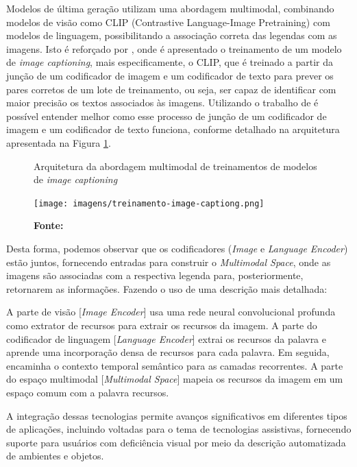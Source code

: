 Modelos de última geração utilizam uma abordagem multimodal, combinando modelos de visão como CLIP (Contrastive Language-Image Pretraining) com modelos de linguagem, possibilitando a associação correta das legendas com as imagens. Isto é reforçado por , onde é apresentado o treinamento de um modelo de \textit{image captioning}, mais especificamente, o CLIP, que é treinado a partir da junção de um codificador de imagem e um codificador de texto para prever os pares corretos de um lote de treinamento, ou seja, ser capaz de identificar com maior precisão os textos associados às imagens. Utilizando o trabalho de  é possível entender melhor como esse processo de junção de um codificador de imagem e um codificador de texto funciona, conforme detalhado na arquitetura apresentada na Figura \ref{fig:1}.

\begin{figure}[!ht]
     \caption{Arquitetura da abordagem multimodal de treinamentos de modelos de \textit{image captioning}}
     \centering
     \texttt{[image: imagens/treinamento-image-captiong.png]}
     \label{fig:1}
     \caption*{\textbf{Fonte:} }
\end{figure}

Desta forma, podemos observar que os codificadores (\textit{Image} e \textit{Language Encoder}) estão juntos, fornecendo entradas para construir o \textit{Multimodal Space}, onde as imagens são associadas com a respectiva legenda para, posteriormente, retornarem as informações. Fazendo o uso de uma descrição mais detalhada:

\begin{citacao}
    A parte de visão [\textit{Image Encoder}] usa uma rede neural convolucional profunda como extrator de recursos para extrair os recursos da imagem. A parte do codificador de linguagem [\textit{Language Encoder}] extrai os recursos da palavra e aprende uma incorporação densa de recursos para cada palavra. Em seguida, encaminha o contexto temporal semântico para as camadas recorrentes. A parte do espaço multimodal [\textit{Multimodal Space}] mapeia os recursos da imagem em um espaço comum com a palavra recursos. \cite{Hossain2019}    
\end{citacao}

A integração dessas tecnologias permite avanços significativos em diferentes tipos de aplicações, incluindo voltadas para o tema de tecnologias assistivas, fornecendo suporte para usuários com deficiência visual por meio da descrição automatizada de ambientes e objetos. 

